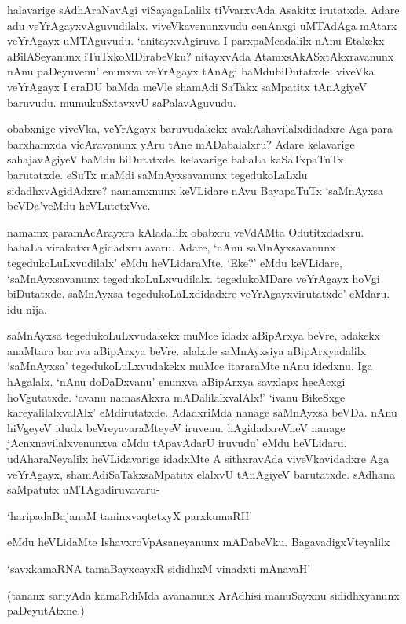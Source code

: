 halavarige sAdhAraNavAgi viSayagaLalilx tiVvarxvAda Asakitx irutatxde. Adare adu veYrAgayxvAguvudilalx. viveVkavenunxvudu cenAnxgi uMTAdAga mAtarx veYrAgayx uMTAguvudu. `anitayxvAgiruva I parxpaMcadalilx nAnu Etakekx aBilASeyanunx iTuTxkoMDirabeVku? nitayxvAda AtamxsAkASxtAkxravanunx nAnu paDeyuvenu' enunxva veYrAgayx tAnAgi baMdubiDutatxde. viveVka veYrAgayx I eraDU baMda meVle shamAdi SaTakx saMpatitx tAnAgiyeV baruvudu. mumukuSxtavxvU saPalavAguvudu.

obabxnige viveVka, veYrAgayx baruvudakekx avakAshavilalxdidadxre Aga para barxhamxda vicAravanunx yAru tAne mADabalalxru? Adare kelavarige sahajavAgiyeV baMdu biDutatxde. kelavarige bahaLa kaSaTxpaTuTx barutatxde. eSuTx maMdi saMnAyxsavanunx tegedukoLaLxlu sidadhxvAgidAdxre? namamxnunx keVLidare nAvu BayapaTuTx `saMnAyxsa beVDa'veMdu heVLutetxVve.

namamx paramAcArayxra kAladalilx obabxru veVdAMta Odutitxdadxru. bahaLa virakatxrAgidadxru avaru. Adare, `nAnu saMnAyxsavanunx tegedukoLuLxvudilalx' eMdu heVLidaraMte. `Eke?' eMdu keVLidare, `saMnAyxsavanunx tegedukoLuLxvudilalx. tegedukoMDare veYrAgayx hoVgi biDutatxde. saMnAyxsa tegedukoLaLxdidadxre veYrAgayxvirutatxde' eMdaru. idu nija.

saMnAyxsa tegedukoLuLxvudakekx muMce idadx aBipArxya beVre, adakekx anaMtara baruva aBipArxya beVre. alalxde saMnAyxsiya aBipArxyadalilx `saMnAyxsa' tegedukoLuLxvudakekx muMce itararaMte nAnu idedxnu. Iga hAgalalx. `nAnu doDaDxvanu' enunxva aBipArxya savxlapx hecAcxgi hoVgutatxde. `avanu namasAkxra mADalilalxvalAlx!' `ivanu BikeSxge kareyalilalxvalAlx' eMdirutatxde. AdadxriMda nanage saMnAyxsa beVDa. nAnu hiVgeyeV idudx beVreyavaraMteyeV iruvenu. hAgidadxreVneV nanage jAcnxnavilalxvenunxva oMdu tApavAdarU iruvudu' eMdu heVLidaru. udAharaNeyalilx heVLidavarige idadxMte A sithxravAda viveVkavidadxre Aga veYrAgayx, shamAdiSaTakxsaMpatitx elalxvU tAnAgiyeV barutatxde. sAdhana saMpatutx uMTAgadiruvavaru-

\begin{shloka}
`haripadaBajanaM taninxvaqtetxyX parxkumaRH'
\end{shloka}

eMdu heVLidaMte IshavxroVpAsaneyanunx mADabeVku. BagavadigxVteyalilx 

\begin{shloka}
`savxkamaRNA tamaBayxcayxR sididhxM vinadxti mAnavaH'
\end{shloka}

(tananx sariyAda kamaRdiMda avananunx ArAdhisi manuSayxnu sididhxyanunx paDeyutAtxne.)

